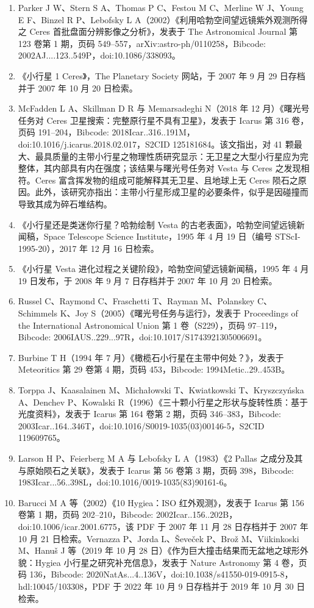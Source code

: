 \begin{enumerate}
\item Parker J W、Stern S A、Thomas P C、Festou M C、Merline W J、Young E F、Binzel R P、Lebofsky L A（2002）《利用哈勃空间望远镜紫外观测所得之 Ceres 首批盘面分辨影像之分析》，发表于 The Astronomical Journal 第 123 卷第 1 期，页码 549–557，arXiv:astro-ph/0110258，Bibcode: 2002AJ....123..549P，doi:10.1086/338093。
\item 《小行星 1 Ceres》，The Planetary Society 网站，于 2007 年 9 月 29 日存档并于 2007 年 10 月 20 日检索。
\item McFadden L A、Skillman D R 与 Memarsadeghi N（2018 年 12 月）《曙光号任务对 Ceres 卫星搜索：完整原行星不具有卫星》，发表于 Icarus 第 316 卷，页码 191–204，Bibcode: 2018Icar..316..191M，doi:10.1016/j.icarus.2018.02.017，S2CID 125181684。该文指出，对 41 颗最大、最具质量的主带小行星之物理性质研究显示：无卫星之大型小行星应为完整体，其内部具有内在强度；该结果与曙光号任务对 Vesta 与 Ceres 之发现相符。Ceres 富含挥发物的组成可能解释其无卫星、且地球上无 Ceres 陨石之原因。此外，该研究亦指出：主带小行星形成卫星的必要条件，似乎是因碰撞而导致其成为碎石堆结构。
\item 《小行星还是类迷你行星？哈勃绘制 Vesta 的古老表面》，哈勃空间望远镜新闻稿，Space Telescope Science Institute，1995 年 4 月 19 日（编号 STScI-1995-20），2017 年 12 月 16 日检索。
\item 《小行星 Vesta 进化过程之关键阶段》，哈勃空间望远镜新闻稿，1995 年 4 月 19 日发布，于 2008 年 9 月 7 日存档并于 2007 年 10 月 20 日检索。
\item Russel C、Raymond C、Fraschetti T、Rayman M、Polanskey C、Schimmels K、Joy S（2005）《曙光号任务与运行》，发表于 Proceedings of the International Astronomical Union 第 1 卷（S229），页码 97–119，Bibcode: 2006IAUS..229...97R，doi:10.1017/S1743921305006691。
\item Burbine T H（1994 年 7 月）《橄榄石小行星在主带中何处？》，发表于 Meteoritics 第 29 卷第 4 期，页码 453，Bibcode: 1994Metic..29..453B。
\item Torppa J、Kaasalainen M、Michałowski T、Kwiatkowski T、Kryszczyńska A、Denchev P、Kowalski R（1996）《三十颗小行星之形状与旋转性质：基于光度资料》，发表于 Icarus 第 164 卷第 2 期，页码 346–383，Bibcode: 2003Icar..164..346T，doi:10.1016/S0019-1035(03)00146-5，S2CID 119609765。
\item Larson H P、Feierberg M A 与 Lebofsky L A（1983）《2 Pallas 之成分及其与原始陨石之关联》，发表于 Icarus 第 56 卷第 3 期，页码 398，Bibcode: 1983Icar...56..398L，doi:10.1016/0019-1035(83)90161-6。
\item Barucci M A 等（2002）《10 Hygiea：ISO 红外观测》，发表于 Icarus 第 156 卷第 1 期，页码 202–210，Bibcode: 2002Icar..156..202B，doi:10.1006/icar.2001.6775，该 PDF 于 2007 年 11 月 28 日存档并于 2007 年 10 月 21 日检索。Vernazza P、Jorda L、Ševeček P、Brož M、Viikinkoski M、Hanuš J 等（2019 年 10 月 28 日）《作为巨大撞击结果而无盆地之球形外貌：Hygiea 小行星之研究补充信息》，发表于 Nature Astronomy 第 4 卷，页码 136，Bibcode: 2020NatAs...4..136V，doi:10.1038/s41550-019-0915-8，hdl:10045/103308，PDF 于 2022 年 10 月 9 日存档并于 2019 年 10 月 30 日检索。

\end{enumerate}
